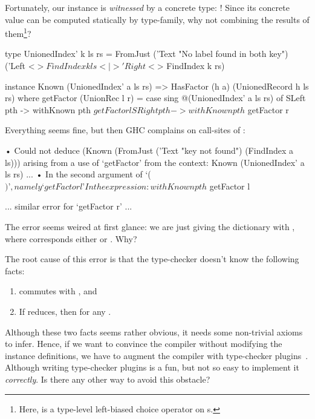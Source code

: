 \documentclass[demotion-paper.tex]{subfiles}
\begin{document}
Fortunately, our  instance is \emph{witnessed} by a concrete type: !
Since its concrete value can be computed statically by  type-family, why not combining the results of them\footnote{Here, \hask{(<|>)} is a type-level left-biased choice operator on s.}?
\begin{code}
type UnionedIndex' k ls rs =
  FromJust ('Text "No label found in both key")
    ('Left <$> FindIndex k ls <|> 'Right <$> FindIndex k rs)

instance
  Known (UnionedIndex' a ls rs) =>
  HasFactor (h a) (UnionedRecord h ls rs) where
  getFactor (UnionRec l r) =
    case sing @(UnionedIndex' a ls rs) of
      SLeft pth -> withKnown pth $ getFactor l
      SRight pth -> withKnown pth $ getFactor r
\end{code}
Everything seems fine, but then GHC complains on call-sites of :
\begin{repl}
• Could not deduce (Known (FromJust ('Text "key not found") (FindIndex a ls)))
  arising from a use of ‘getFactor’
  from the context: Known (UnionedIndex' a ls rs)
...
• In the second argument of ‘($)’, namely ‘getFactor l’
  In the expression: withKnown pth $ getFactor l

... similar error for `getFactor r' ...
\end{repl}
The error seems weired at first glance: we are just giving the  dictionary with , where  corresponds either  or . Why?

The root cause of this error is that the type-checker doesn't know the following facts:
\begin{enumerate}
  \item {} commutes with \hask{(<|>)}, and
  \item If  reduces, then  for any .
\end{enumerate}
Although these two facts seems rather obvious, it needs some non-trivial axioms to infer.
Hence, if we want to convince the compiler without modifying the instance definitions, we have to augment the compiler with type-checker plugins~\cite{GHC-Team:2020aa}.
Although writing type-checker plugins is a fun, but not so easy to implement it \emph{correctly}. Is there any other way to avoid this obstacle?
\end{document}
